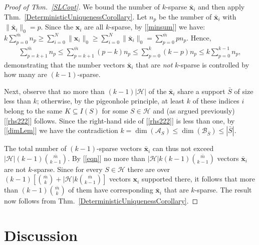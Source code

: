 \documentclass[9pt,twocolumn]{pnas-new}
\renewcommand{\eqref}[1]{\textnormal{[\ref{#1}]}}
\begin{document}
\begin{proof}[Proof of Thm.~\ref{SLCopt}]
We bound the number of $k$-sparse $\mathbf{\bar x}_i$ and then apply Thm.~\ref{DeterministicUniquenessCorollary}. 
Let $n_p$ be the number of $\mathbf{\bar x}_i$ with $\|\mathbf{\bar x}_i\|_0 = p$.
Since the $\mathbf{x}_i$ are all $k$-sparse, by \eqref{minsum} we have:
\mbox{$k \sum_{p = 0}^{\bar m} n_p \geq \sum_{i=0}^N \|\mathbf{x}_i\|_0 \geq \sum_{i=0}^N \|\mathbf{\bar x}_i\|_0 = \sum_{p=0}^{\bar m} p n_p.$}
Hence,
\begin{align}\label{eqn}
\sum_{p = k+1}^{\bar m} n_p \leq \sum_{p = k+1}^{\bar m} (p-k) n_p \leq \sum_{p = 0}^k (k-p)n_p \leq k \sum_{p = 0}^{k-1} n_p,
\end{align}
%
demonstrating that the number vectors $\mathbf{\bar x}_i$ that are \emph{not} $k$-sparse is controlled by how many are $(k-1)$-sparse. 

Next, observe that no more than $(k-1)|\mathcal{H}|$ of the $\mathbf{\bar x}_i$ share a support $\bar S$ of size less than $k$; otherwise, by the pigeonhole principle, at least $k$ of these indices $i$ belong to the same $K \subseteq I(S)$ for some $S \in \mathcal{H}$ and (as argued previously) \eqref{rhs222} follows. Since the right-hand side of \eqref{rhs222} is less than one, by \eqref{dimLem} we have the contradiction $k = \dim(\bm{\mathcal{A}}_S) \leq \dim(\bm{\mathcal{B}}_{\bar S}) \leq |\bar S|.$ 

The total number of $(k-1)$-sparse vectors $\mathbf{\bar x}_i$ can thus not exceed $|\mathcal{H}|(k-1){ \bar m \choose k-1}$. By \eqref{eqn} no more than $|\mathcal{H}|k(k-1){ \bar m \choose k-1}$ vectors $\mathbf{\bar x}_i$ are not $k$-sparse. Since for every $S \in \mathcal{H}$ there are over $(k-1)\left[ {\bar m \choose k} + |\mathcal{H}|k{ \bar m \choose k-1} \right]$ vectors $\mathbf{x}_i$ supported there, it follows that more than $(k-1){\bar m \choose k}$ of them have corresponding $\mathbf{\bar x}_i$ that are $k$-sparse. The result now follows from Thm.~\ref{DeterministicUniquenessCorollary}.
\end{proof}

\section{Discussion}\label{Discussion}
\end{document}
